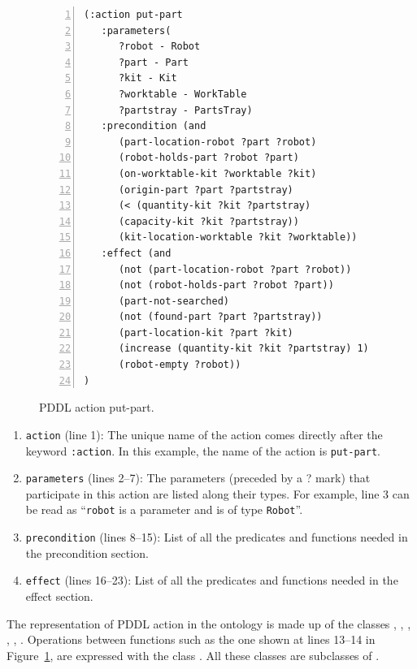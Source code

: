 \begin{figure}[t!h!]
\begin{minipage}{.5\paperwidth}
\begin{list}{}{\setlength{\leftmargin}{1em}}\item\small
\begin{Verbatim}[commandchars=\\\{\},fontsize=\scriptsize, numbers=left, numbersep=2pt]
(:action put-part
   :parameters(
      ?robot - Robot
      ?part - Part
      ?kit - Kit
      ?worktable - WorkTable
      ?partstray - PartsTray)
   :precondition (and
      (part-location-robot ?part ?robot)
      (robot-holds-part ?robot ?part)
      (on-worktable-kit ?worktable ?kit)
      (origin-part ?part ?partstray)
      (< (quantity-kit ?kit ?partstray)
      (capacity-kit ?kit ?partstray))
      (kit-location-worktable ?kit ?worktable))
   :effect (and
      (not (part-location-robot ?part ?robot))
      (not (robot-holds-part ?robot ?part))
      (part-not-searched)
      (not (found-part ?part ?partstray))
      (part-location-kit ?part ?kit)
      (increase (quantity-kit ?kit ?partstray) 1)
      (robot-empty ?robot))
)
\end{Verbatim}
\end{list}
\end{minipage}
\caption{PDDL action put-part.}
\label{fig:put-part}
\end{figure}

\begin{enumerate}
  \item \texttt{action} (line 1): The unique name of the action comes directly after the keyword \texttt{:action}. In this example, the name of the action is \texttt{put-part}.
  \item \texttt{parameters} (lines 2--7): The parameters (preceded by a ? mark) that participate in this action are listed along their types. For example, line 3 can be read as ``\texttt{robot} is a parameter and is of type \texttt{Robot}''.
  \item \texttt{precondition} (lines 8--15): List of all the predicates and functions needed in the precondition section.
  \item \texttt{effect} (lines 16--23): List of all the predicates and functions needed in the effect section.
\end{enumerate}

The representation of PDDL action in the ontology is made up of the classes , , , , , .  Operations between functions such as the one shown at lines 13--14 in Figure~\ref{fig:put-part}, are expressed with the class . All these classes are subclasses of .

